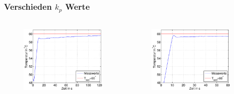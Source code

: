 \begin{frame}
    \frametitle{Verschieden $k_p$ Werte}
    \framesubtitle{}
    \begin{columns}[c]
            \begin{figure}[H]
            \begin{center}
                    \includegraphics[scale=0.3]{./img/plots/2d_kb_0_5_t_200.eps}
            \end{center}
            \end{figure}
            \begin{figure}[H]
            \begin{center}
                    \includegraphics[scale=0.3]{./img/plots/2d_kb_0_8_t_200.eps}

\end{center}
\end{figure}
\end{columns}
\end{frame}
